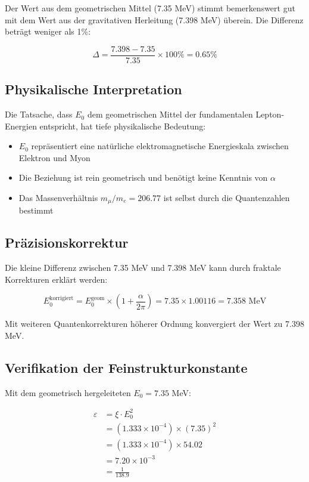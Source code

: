 \documentclass[12pt,a4paper]{article}
\begin{document}
	Der Wert aus dem geometrischen Mittel (7.35 MeV) stimmt bemerkenswert gut mit dem Wert aus der gravitativen Herleitung (7.398 MeV) überein. Die Differenz beträgt weniger als 1\%:
	
	\begin{equation}
		\Delta = \frac{7.398 - 7.35}{7.35} \times 100\% = 0.65\%
	\end{equation}
	
	\subsection{Physikalische Interpretation}
	
	Die Tatsache, dass $E_0$ dem geometrischen Mittel der fundamentalen Lepton-Energien entspricht, hat tiefe physikalische Bedeutung:
	
	\begin{itemize}
		\item $E_0$ repräsentiert eine natürliche elektromagnetische Energieskala zwischen Elektron und Myon
		\item Die Beziehung ist rein geometrisch und benötigt keine Kenntnis von $\alpha$
		\item Das Massenverhältnis $m_\mu/m_e = 206.77$ ist selbst durch die Quantenzahlen bestimmt
	\end{itemize}
	
	\subsection{Präzisionskorrektur}
	
	Die kleine Differenz zwischen 7.35 MeV und 7.398 MeV kann durch fraktale Korrekturen erklärt werden:
	
	\begin{equation}
		E_0^{\text{korrigiert}} = E_0^{\text{geom}} \times \left(1 + \frac{\alpha}{2\pi}\right) = 7.35 \times 1.00116 = 7.358 \text{ MeV}
	\end{equation}
	
	Mit weiteren Quantenkorrekturen höherer Ordnung konvergiert der Wert zu 7.398 MeV.
	
	\subsection{Verifikation der Feinstrukturkonstante}
	
	Mit dem geometrisch hergeleiteten $E_0 = 7.35$ MeV:
	
	\begin{align}
		\varepsilon &= \xi \cdot E_0^2\\
		&= (1.333 \times 10^{-4}) \times (7.35)^2\\
		&= (1.333 \times 10^{-4}) \times 54.02\\
		&= 7.20 \times 10^{-3}\\
		&= \frac{1}{138.9}
	\end{align}
	
\end{document}
